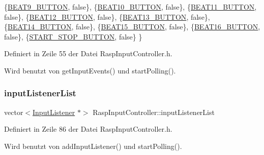 \begin{DoxyCode}
            \{\hyperlink{namespaceinputs_af628ea84bf7114a62249d4bb425ed06a}{BEAT9\_BUTTON},           \textcolor{keyword}{false}\},
            \{\hyperlink{namespaceinputs_a9778bcf3a44a9d16ae156bac6d745a24}{BEAT10\_BUTTON},          \textcolor{keyword}{false}\},
            \{\hyperlink{namespaceinputs_ad09e4010a8b08721988599b198645372}{BEAT11\_BUTTON},          \textcolor{keyword}{false}\},
            \{\hyperlink{namespaceinputs_a7b6bb44b9241cac31ff9909c3fc88271}{BEAT12\_BUTTON},          \textcolor{keyword}{false}\},
            \{\hyperlink{namespaceinputs_a8f9d547eaa8c52cebfa64221341f266a}{BEAT13\_BUTTON},          \textcolor{keyword}{false}\},
            \{\hyperlink{namespaceinputs_a4dfd34a5656f72c71f1b2dd8efc963dc}{BEAT14\_BUTTON},          \textcolor{keyword}{false}\},
            \{\hyperlink{namespaceinputs_a1952aa2d27b65c8d8899a1ae1cfb7bb9}{BEAT15\_BUTTON},          \textcolor{keyword}{false}\},
            \{\hyperlink{namespaceinputs_af0f3099a06352ba4eb0808091b908178}{BEAT16\_BUTTON},          \textcolor{keyword}{false}\},
            \{\hyperlink{namespaceinputs_ab1d04ae8b7a7f4d11849c110f20fae10}{START\_STOP\_BUTTON},      \textcolor{keyword}{false}\}
    \}
\end{DoxyCode}


Definiert in Zeile 55 der Datei Rasp\+Input\+Controller.\+h.



Wird benutzt von get\+Input\+Events() und start\+Polling().

\mbox{\label{class_rasp_input_controller_a5a5a8d99d69c35e206ddf7467e36cfae}} 
\subsubsection{\texorpdfstring{input\+Listener\+List}{inputListenerList}}
{\footnotesize\ttfamily vector$<$\hyperlink{class_input_listener}{Input\+Listener} $\ast$$>$ Rasp\+Input\+Controller\+::input\+Listener\+List\hspace{0.3cm}{\ttfamily [private]}}



Definiert in Zeile 86 der Datei Rasp\+Input\+Controller.\+h.



Wird benutzt von add\+Input\+Listener() und start\+Polling().

